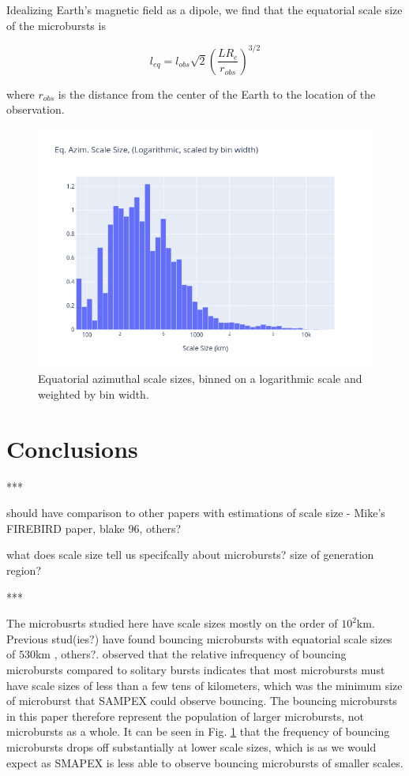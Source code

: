 \documentclass[draft]{agujournal2019}
\begin{document}
Idealizing Earth's magnetic field as a dipole, we find that the equatorial scale size of the microbursts is 

\begin{equation}
l_{eq} = l_{obs} \sqrt{2} \left( \frac{L R_e}{r_{obs} } \right)^{3/2}
\end{equation}

where $r_{obs}$ is the distance from the center of the Earth to the location of the observation.

\begin{figure}[h!]
 \includegraphics[width=\textwidth]{log_eq_scales.png}
 \caption{Equatorial azimuthal scale sizes, binned on a logarithmic scale and weighted by bin width.}
 \label{fig:log_eq_scales}
\end{figure}

\section{Conclusions}
***

should have comparison to other papers with estimations of scale size - Mike's FIREBIRD paper, blake 96, others?

what does scale size tell us specifcally about microbursts? size of generation region? 

***

The microbusrts studied here have scale sizes mostly on the order of $10^2$km.
Previous stud(ies?) have found bouncing microbursts with equatorial scale sizes of $530$km \cite{fire_bounce}, others?.
\cite{Blake96} observed that the relative infrequency of bouncing microbursts compared to solitary bursts indicates that most microbursts must have scale sizes of less than a few tens of kilometers, which was the minimum size of microburst that SAMPEX could observe bouncing. 
The bouncing microbursts in this paper therefore represent the population of larger microbursts, not microbursts as a whole.
It can be seen in Fig. \ref{fig:log_eq_scales} that the frequency of bouncing microbursts drops off substantially at lower scale sizes, which is as we would expect as SMAPEX is less able to observe bouncing microbursts of smaller scales. 
\end{document}
